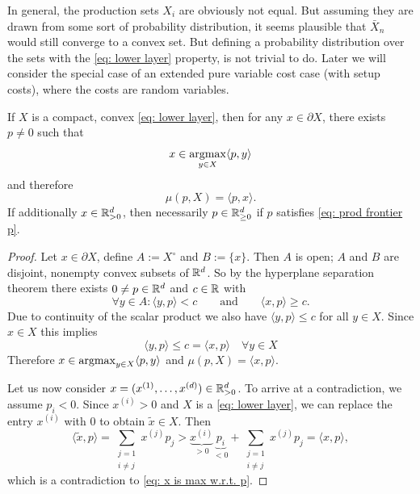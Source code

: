 In general, the production sets \(X_i\) are obviously not equal. But assuming
they are drawn from some sort of probability distribution, it seems plausible
that \(\bar{X}_n\) would still converge to a convex set. But defining a
probability distribution over the sets with the \ref{eq: lower layer} property,
is not trivial to do. Later we will consider the special case of an
extended pure variable cost case (with setup costs), where the costs are random
variables.

\begin{lemma}
	If \(X\) is a compact, convex \ref{eq: lower
	layer}, then for any \(x\in \partial X\), there exists
	\(p\neq 0\) such that
	\begin{equation}
		\label{eq: prod frontier p}
		x \in \argmax_{y\in X} \langle p, y\rangle %
	\end{equation}
	and therefore
	\[
		\mu(p, X) = \langle p, x\rangle.
	\]
	If additionally \(x\in\mathbb{R}_{>0}^d\), then necessarily \(p\in\mathbb{R}_{\ge
	0}^d\) if \(p\) satisfies \eqref{eq: prod frontier p}.
\end{lemma}
\begin{proof}
	Let \(x\in \partial X\), define \(A:=X^\circ\) and \(B:=\{x\}\). Then \(A\)
	is open; \(A\) and \(B\) are disjoint, nonempty
	convex subsets of \(\mathbb{R}^d\). So by the hyperplane separation theorem
	there exists
	\(0\neq p\in\mathbb{R}^d\) and \(c\in\mathbb{R}\) with
	\[
		\forall y\in A : \langle y, p\rangle < c
		\qquad\text{and}\qquad
		\langle x, p\rangle \ge c.
	\]
	Due to continuity of the scalar product we also have \(\langle y, p\rangle
	\le c\) for all \(y\in X\). Since \(x\in X\) this implies
	\begin{equation}
		\label{eq: x is max w.r.t. p}
		\langle y, p\rangle \le c = \langle x, p\rangle \quad \forall y\in X
	\end{equation}
	Therefore \(x\in\operatorname*{argmax}_{y\in X} \langle p, y\rangle\) and \(\mu(p, X) =
	\langle x, p\rangle\).

	Let us now consider \(x=(x^{(1)},\dots,x^{(d)})\in\mathbb{R}_{>0}^d\).
	To arrive at a contradiction, we assume \(p_i < 0\). Since \(x^{(i)}>0\) and
	\(X\) is a \ref{eq: lower layer}, we can replace the entry \(x^{(i)}\) with
	\(0\) to obtain \(\tilde{x}\in X\). Then
	\[
		\langle \tilde{x}, p\rangle
		= \sum_{\substack{j=1\\i\neq j}} x^{(j)} p_j
		> \underbrace{x^{(i)}}_{>0}\underbrace{p_i}_{<0}
		+ \sum_{\substack{j=1\\i\neq j}} x^{(j)} p_j
		= \langle x, p\rangle,
	\]
	which is a contradiction to \eqref{eq: x is max w.r.t. p}.
\end{proof}

